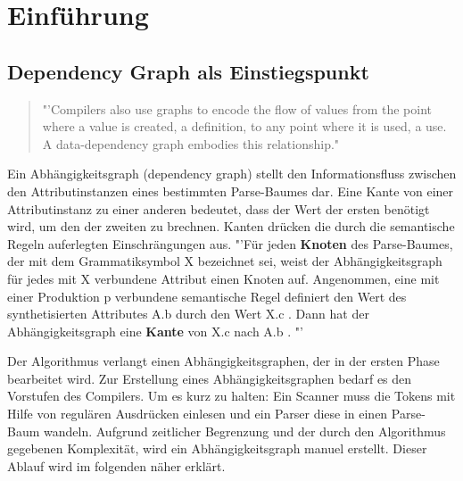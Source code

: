 \chapter{Einführung}
\label{Einfuehrung}






\newpage
\section{Dependency Graph als Einstiegspunkt}
\begin{quotation}
	"'Compilers also use graphs to encode the flow of values from the point where a value is created, a definition, to any point where it is used, a use. A data-dependency graph embodies this relationship." \cite{HeBIS-309344573}
\end{quotation}
Ein Abhängigkeitsgraph (dependency graph) stellt den Informationsfluss zwischen den Attributinstanzen eines bestimmten Parse-Baumes dar. Eine Kante von einer Attributinstanz zu einer anderen bedeutet, dass der Wert der ersten benötigt wird, um den der zweiten zu brechnen. Kanten drücken die durch die semantische Regeln auferlegten Einschrängungen aus. "'Für jeden \textbf{Knoten} des Parse-Baumes, der mit dem Grammatiksymbol X bezeichnet sei, weist der Abhängigkeitsgraph für jedes mit X verbundene Attribut einen Knoten auf. Angenommen, eine mit einer Produktion p verbundene semantische Regel definiert den Wert des synthetisierten Attributes A.b durch den Wert X.c . Dann hat der Abhängigkeitsgraph eine \textbf{Kante} von X.c nach A.b . \cite{HeBIS-194410269}"' 

Der Algorithmus verlangt einen Abhängigkeitsgraphen, der in der ersten Phase bearbeitet wird. Zur Erstellung eines Abhängigkeitsgraphen bedarf es den Vorstufen des Compilers. Um es kurz zu halten: Ein Scanner muss die Tokens mit Hilfe von regulären Ausdrücken einlesen und ein Parser diese in einen Parse-Baum wandeln. Aufgrund zeitlicher Begrenzung und der durch den Algorithmus gegebenen Komplexität, wird ein Abhängigkeitsgraph manuel erstellt. Dieser Ablauf wird im folgenden näher erklärt.

